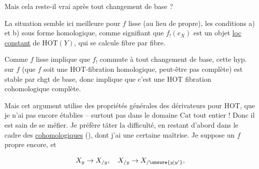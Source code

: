 

Mais cela reste-il vrai après tout changement de base ?

La situation semble ici meilleure pour $f$ lisse (au lieu de propre),   les conditions a) et b) sous forme homologique, comme signifiant que $f_!(e_X)$ est un objet \uline{loc constant} de $\mathrm{HOT}(Y)$, qui se calcule fibre par fibre.

Comme $f$ lisse implique que $f_!$ commute à tout changement de base,  cette hyp.  sur $f$ (que $f$ soit une HOT-fibration homologique, peut-être pas complète)  est stable par chgt de base, donc implique que c'est une HOT fibration cohomologique complète.

Mais cet argument utilise  des propriétés générales des dérivateurs pour HOT, que je n'ai pas encore établies -- surtout pas dans le domaine $\mathrm{Cat}$ tout entier ! Donc il est sain de se méfier. Je préfère tâter la difficulté, en restant d'abord dans le cadre des  \uline{cohomologiques} (), dont j'ai une certaine maîtrise. Je suppose un $f$ propre encore, et 

\[
X_y\to X_{/y},\quad X_{/y}\to X_{/\unsure{y|y'}},
\]

